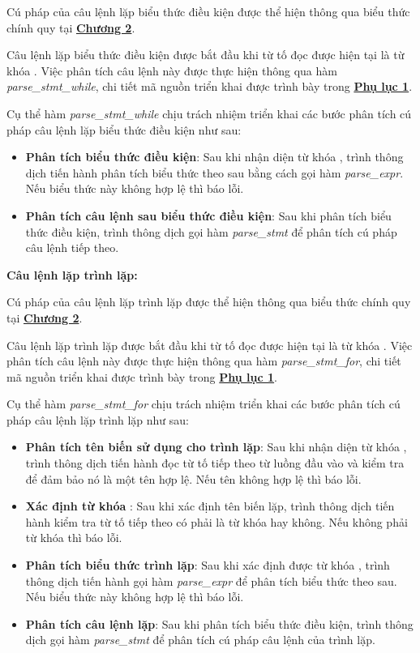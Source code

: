 Cú pháp của câu lệnh lặp biểu thức điều kiện được thể hiện thông qua biểu thức chính quy tại \hyperref[ch2:while_stmt]{\bf Chương 2}.

Câu lệnh lặp biểu thức điều kiện được bắt đầu khi từ tố đọc được hiện tại là từ khóa . Việc phân tích câu lệnh này được thực hiện thông qua hàm \textit{parse\_stmt\_while}, chi tiết mã nguồn triển khai được trình bày trong \hyperref[ap1:stmt_during]{\bf Phụ lục 1}. %

Cụ thể hàm \textit{parse\_stmt\_while} chịu trách nhiệm triển khai các bước phân tích cú pháp câu lệnh lặp biểu thức điều kiện như sau:
\begin{itemize}
    \item \textbf{Phân tích biểu thức điều kiện}:
    Sau khi nhận diện từ khóa , trình thông dịch tiến hành phân tích biểu thức theo sau bằng cách gọi hàm \textit{parse\_expr}. Nếu biểu thức này không hợp lệ thì báo lỗi.
    \item \textbf{Phân tích câu lệnh sau biểu thức điều kiện}:
    Sau khi phân tích biểu thức điều kiện, trình thông dịch gọi hàm \textit{parse\_stmt} để phân tích cú pháp câu lệnh tiếp theo.
\end{itemize}

\noindent\textbf{Câu lệnh lặp trình lặp:} 

Cú pháp của câu lệnh lặp trình lặp được thể hiện thông qua biểu thức chính quy tại \hyperref[ch2:for_stmt]{\bf Chương 2}.

Câu lệnh lặp trình lặp được bắt đầu khi từ tố đọc được hiện tại là từ khóa . Việc phân tích câu lệnh này được thực hiện thông qua hàm \textit{parse\_stmt\_for}, chi tiết mã nguồn triển khai được trình bày trong \hyperref[ap1:stmt_for]{\bf Phụ lục 1}. %

Cụ thể hàm \textit{parse\_stmt\_for} chịu trách nhiệm triển khai các bước phân tích cú pháp câu lệnh lặp trình lặp như sau:

\begin{itemize}
    \item \textbf{Phân tích tên biến sử dụng cho trình lặp}:
    Sau khi nhận diện từ khóa , trình thông dịch tiến hành đọc từ tố tiếp theo từ luồng đầu vào và kiểm tra để đảm bảo nó là một tên hợp lệ. Nếu tên không hợp lệ thì báo lỗi.
    \item \textbf{Xác định từ khóa }:
    Sau khi xác định tên biến lặp, trình thông dịch tiến hành kiểm tra từ tố tiếp theo có phải là từ khóa  hay không. Nếu không phải từ khóa  thì báo lỗi.
    \item \textbf{Phân tích biểu thức trình lặp}:
    Sau khi xác định được từ khóa , trình thông dịch tiến hành gọi hàm \textit{parse\_expr} để phân tích biểu thức theo sau. Nếu biểu thức này không hợp lệ thì báo lỗi.
    \item \textbf{Phân tích câu lệnh lặp}:
    Sau khi phân tích biểu thức điều kiện, trình thông dịch gọi hàm \textit{parse\_stmt} để phân tích cú pháp câu lệnh của trình lặp.
\end{itemize}

